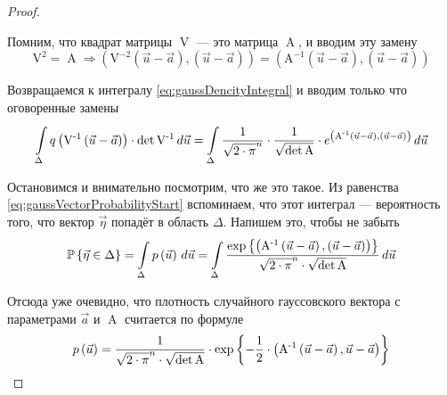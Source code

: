 \begin{proof}
\begin{enumerate}
            Помним, что квадрат матрицы $\operatorname{V}$ --- это матрица
            $\operatorname{A}$, и вводим эту замену
            $$\operatorname{V^2} = \operatorname{A} \Rightarrow
                \left( \operatorname{V^{-2}} \left( \vec{u} - \vec{a} \right),
                        \left( \vec{u} - \vec{a} \right) \right)
                = \left( \operatorname{A^{-1}} \left( \vec{u} - \vec{a} \right),
                        \left( \vec{u} - \vec{a} \right) \right)$$
    \end{enumerate}

    Возвращаемся к интегралу \eqref{eq:gaussDencityIntegral} и вводим
    только что оговоренные замены
    $$\integrall{\Delta}{d\vec{u}}{ q\left( \operatorname{V^{-1}}
                \left( \vec{u} - \vec{a} \right) \right)
            \cdot \det{\operatorname{V^{-1}}}}
        = \integrall{\Delta}{d\vec{u}}{\frac{1}{\sqrt{2 \cdot \pi}^n}
            \cdot \frac{1}{\sqrt{\det{\operatorname{A}}}}
            \cdot e^{\left( \operatorname{A^{-1}}
                    \left( \vec{u} - \vec{a} \right),
                \left( \vec{u} - \vec{a} \right) \right)}}$$

    Остановимся и внимательно посмотрим, что же это такое. Из равенства
    \eqref{eq:gaussVectorProbabilityStart} вспоминаем, что этот интеграл ---
    вероятность того, что вектор $\vec{\eta}$ попадёт в область $\Delta$.
    Напишем это, чтобы не забыть
    $$\Probability{\vec{\eta} \in \Delta}
        = \integrall{\Delta}{d\vec{u}}{\pdf{\vec{u}}}
        = \integrall{\Delta}{d\vec{u}}{
            \frac{\exp{\left\{\left( \operatorname{A^{-1}}
                    \left( \vec{u} - \vec{a} \right),
                \left( \vec{u} - \vec{a} \right) \right) \right\}}}{
                \sqrt{2 \cdot \pi}^n \cdot \sqrt{\det{\operatorname{A}}}}}$$

    Отсюда уже очевидно, что плотность случайного гауссовского вектора с
    параметрами $\vec{a}$ и $\operatorname{A}$ считается по формуле
    $$\pdf{\vec{u}}
        = \frac{1}{\sqrt{2 \cdot \pi}^n \cdot \sqrt{\det{\operatorname{A}}}}
            \cdot \exp{\left\{ -\frac{1}{2} \cdot \left(
                \operatorname{A^{-1}} \left( \vec{u} - \vec{a} \right),
                \vec{u} - \vec{a} \right) \right\}}$$
\end{proof}

